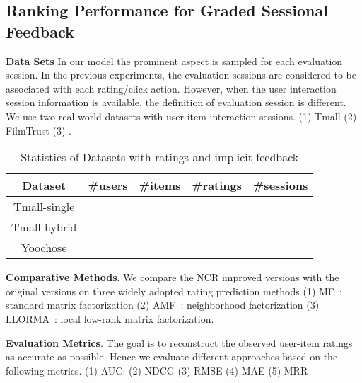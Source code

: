 \documentclass[letterpaper]{article} %
\begin{document}
\subsection{Ranking Performance for Graded Sessional Feedback}

\textbf{Data Sets} In our model the prominent aspect is sampled for each evaluation session. In the previous experiments, the evaluation sessions are considered to be associated with each rating/click action. However, when the user interaction session information is available, the definition of evaluation session is different. We use two real world datasets with user-item interaction sessions. (1) Tmall   (2) FilmTrust (3) . 
\begin{table}[htp]
\caption{Statistics of Datasets with ratings and implicit feedback}
\begin{center}
\begin{tabular}{|c|c|c|c|c|}
\hline
Dataset & \#users & \#items & \#ratings & \#sessions \\\hline
Tmall-single & & & & \\\hline
Tmall-hybrid & & & & \\\hline
Yoochose & & & & \\\hline
\end{tabular}
\end{center}
\label{tab:datasets}
\end{table}%

\textbf{Comparative Methods}. We compare the NCR improved versions with the original versions on three widely adopted rating prediction methods (1) MF~\cite{Koren2009Matrix}: standard matrix factorization  (2) AMF~\cite{Koren2008Factorization}: neighborhood factorization (3) LLORMA~\cite{Lee2013Local}: local low-rank matrix factorization. 

\textbf{Evaluation Metrics}.  The goal is to reconstruct the observed user-item ratings as accurate as possible. Hence we evaluate different approaches based on the following metrics. (1) AUC: (2) NDCG (3) RMSE (4) MAE (5) MRR
\end{document}
